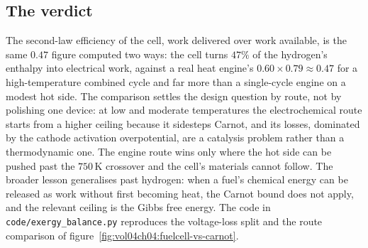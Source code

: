 \subsection{The verdict}

The second-law efficiency of the cell, work delivered over work available, is
the same $0.47$ figure computed two ways: the cell turns $47\%$ of the
hydrogen's enthalpy into electrical work, against a real heat engine's $0.60
\times 0.79 \approx 0.47$ for a high-temperature combined cycle and far more
than a single-cycle engine on a modest hot side. The comparison settles the
design question by route, not by polishing one device: at low and moderate
temperatures the electrochemical route starts from a higher ceiling because it
sidesteps Carnot, and its losses, dominated by the cathode activation
overpotential, are a catalysis problem rather than a thermodynamic one. The
engine route wins only where the hot side can be pushed past the
$750\,\si{\kelvin}$ crossover and the cell's materials cannot follow. The
broader lesson generalises past hydrogen: when a fuel's chemical energy can be
released as work without first becoming heat, the Carnot bound does not apply,
and the relevant ceiling is the Gibbs free energy. The code in
\texttt{code/exergy\_balance.py} reproduces the voltage-loss split and the
route comparison of figure~\ref{fig:vol04ch04:fuelcell-vs-carnot}.





